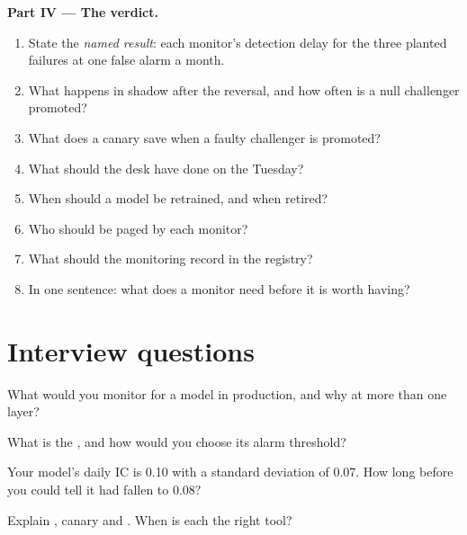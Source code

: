 \begin{problem}
\medskip\noindent\textbf{Part IV --- The verdict.}
\begin{enumerate}[resume]
\item State the \emph{named result}: each monitor's detection delay for the three planted failures at one false alarm a month.
\item What happens in shadow after the reversal, and how often is a null challenger promoted?
\item What does a canary save when a faulty challenger is promoted?
\item What should the desk have done on the Tuesday?
\item When should a model be retrained, and when retired?
\item Who should be paged by each monitor?
\item What should the monitoring record in the registry?
\item In one sentence: what does a monitor need before it is worth having?
\end{enumerate}
\end{problem}

\section{Interview questions}

\begin{interviewq}\label{iq:ml:monitoring-and-retraining:1}
What would you monitor for a model in production, and why at more than one layer?
\end{interviewq}

\begin{interviewq}\label{iq:ml:monitoring-and-retraining:2}
What is the , and how would you choose its alarm threshold?
\end{interviewq}

\begin{interviewq}\label{iq:ml:monitoring-and-retraining:3}
Your model's daily IC is 0.10 with a standard deviation of 0.07. How long before you could tell it had fallen to 0.08?
\end{interviewq}

\begin{interviewq}\label{iq:ml:monitoring-and-retraining:4}
Explain , canary and . When is each the right tool?
\end{interviewq}

